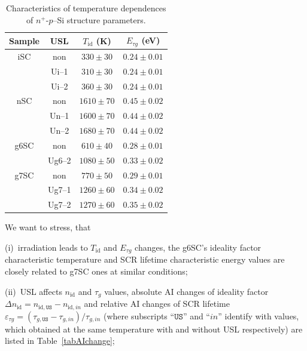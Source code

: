 \documentclass[aip,jap, amsmath,amssymb,reprint]{revtex4-1}
\begin{document}
\begin{table}
\caption{\label{tabTpar}Characteristics of temperature dependences of $n^+$-$p$--Si structure parameters.
}
\begin{ruledtabular}
\begin{tabular}{cccc}
Sample&USL&$T_{\mathrm{id}}$ (K)&$E_{\tau g}$ (eV)\\
\hline
iSC&non&$330\pm30$&$0.24\pm0.01$\\
&Ui--1&$310\pm30$&$0.24\pm0.01$\\
&Ui--2&$360\pm30$&$0.24\pm0.01$\\
nSC&non&$1610\pm70$&$0.45\pm0.02$\\
&Un--1&$1600\pm70$&$0.44\pm0.02$\\
&Un--2&$1680\pm70$&$0.44\pm0.02$\\
g6SC&non&$610\pm40$&$0.28\pm0.01$\\
&Ug6--2&$1080\pm50$&$0.33\pm0.02$\\
g7SC&non&$770\pm50$&$0.29\pm0.01$\\
&Ug7--1&$1260\pm60$&$0.34\pm0.02$\\
&Ug7--2&$1270\pm60$&$0.35\pm0.02$\\
\end{tabular}
\end{ruledtabular}
\end{table}

We want to stress, that

\noindent
(i)~irradiation leads to $T_{\mathrm{id}}$ and $E_{\tau g}$ changes, the g6SC's ideality factor characteristic temperature and SCR lifetime characteristic energy values are closely related to g7SC ones at similar conditions;

\noindent
(ii)~USL affects $n_{\mathrm{id}}$ and $\tau_g$ values, absolute AI changes of ideality factor $\Delta n_{\mathrm{id}}=n_{\mathrm{id},\mathtt{US}}-n_{\mathrm{id},in}$ and
relative AI changes of SCR lifetime $\varepsilon_{\tau g}=(\tau_{g,\mathtt{US}}-\tau_{g,in})/\tau_{g,in}$
(where subscripts ``$\mathtt{US}$'' and ``$in$'' identify with values,
which obtained at the same temperature with and without USL respectively)
are listed in Table~\ref{tabAIchange};
\end{document}
